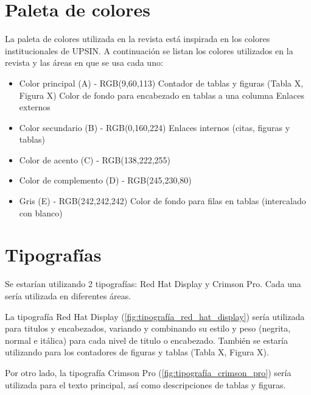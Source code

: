 \documentclass{Manual}
\begin{document}
\section{Paleta de colores}

La paleta de colores utilizada en la revista está inspirada en los colores institucionales de UPSIN. A continuación se listan los colores utilizados en la revista y las áreas en que se usa cada uno:

    


\begin{itemize}
    \item Color principal (A) - RGB(9,60,113)
        \subitem Contador de tablas y figuras (Tabla X, Figura X)
        \subitem Color de fondo para encabezado en tablas a una columna
        \subitem Enlaces externos
    \item Color secundario (B) - RGB(0,160,224)
        \subitem Enlaces internos (citas, figuras y tablas)
    \item Color de acento (C) - RGB(138,222,255)
    \item Color de complemento (D) - RGB(245,230,80)
    \item Gris (E) - RGB(242,242,242)
        \subitem Color de fondo para filas en tablas (intercalado con blanco)
\end{itemize}

\section{Tipografías}

Se estarían utilizando 2 tipografías: Red Hat Display y Crimson Pro. Cada una sería utilizada en diferentes  áreas.

La tipografía Red Hat Display (\autoref{fig:tipografía_red_hat_display}) sería utilizada para titulos y encabezados, variando y combinando su estilo y peso (negrita, normal e itálica) para cada nivel de titulo o encabezado. También se estaría utilizando para los contadores de figuras y tablas (Tabla X, Figura X).

    

Por otro lado, la tipografía Crimson Pro (\autoref{fig:tipografía_crimson_pro}) sería utilizada para el texto principal, así como descripciones de tablas y figuras.
\end{document}
